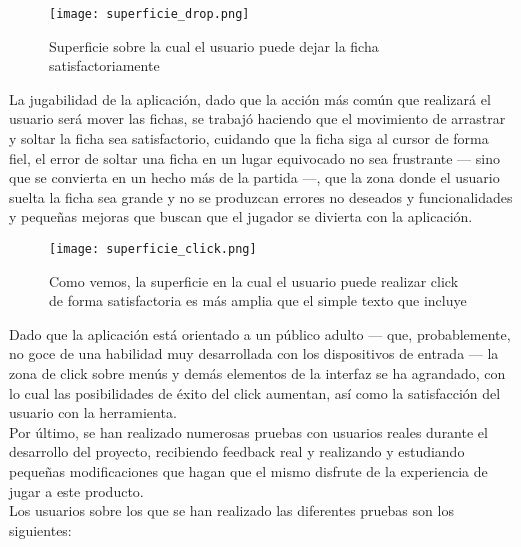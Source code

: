 \begin{figure}[h]
  \begin{center}
    \texttt{[image: superficie\_drop.png]}
  \end{center}
  \caption{Superficie sobre la cual el usuario puede dejar la ficha satisfactoriamente}
  \label{superficie_drop}
\end{figure}


La jugabilidad de la aplicación, dado que la acción más común que realizará el usuario será mover las fichas,
se trabajó haciendo que el movimiento de arrastrar y soltar la ficha sea satisfactorio, cuidando que la ficha siga
al cursor de forma fiel, el error de soltar una ficha en un lugar equivocado no sea frustrante --- sino que se convierta
en un hecho más de la partida ---, que la zona donde el usuario suelta la ficha sea grande y no se produzcan errores
no deseados y funcionalidades y pequeñas mejoras que buscan que el jugador se divierta con la aplicación. \\

\begin{figure}[h]
  \begin{center}
    \texttt{[image: superficie\_click.png]}
  \end{center}
  \caption{Como vemos, la superficie en la cual el usuario puede realizar click de forma satisfactoria es más amplia que el simple texto que incluye}
  \label{superficie_click}
\end{figure}

Dado que la aplicación está orientado a un público adulto --- que, probablemente, no goce de una habilidad muy desarrollada
con los dispositivos de entrada --- la zona de click sobre menús y demás elementos de la interfaz se ha agrandado, con lo
cual las posibilidades de éxito del click aumentan, así como la satisfacción del usuario con la herramienta. \\

Por último, se han realizado numerosas pruebas con usuarios reales durante el desarrollo del proyecto, recibiendo
feedback real y realizando y estudiando pequeñas modificaciones que hagan que el mismo disfrute de la experiencia de
jugar a este producto. \\

Los usuarios sobre los que se han realizado las diferentes pruebas son los siguientes:

